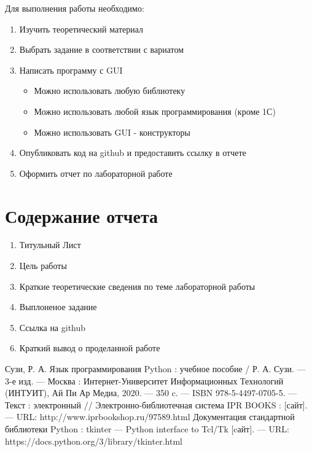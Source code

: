 \documentclass[a4paper]{article}
\begin{document}
Для выполнения работы необходимо:
\begin{enumerate}
  \item Изучить теоретический материал
  \item Выбрать задание в соответствии с вариатом
  \item Написать программу с GUI
    \begin{itemize}
      \item Можно использовать любую библиотеку
      \item Можно использовать любой язык программирования (кроме 1С)
      \item Можно использовать GUI - конструкторы
    \end{itemize}
  \item Опубликовать код на github и предоставить ссылку в отчете
  \item Оформить отчет по лабораторной работе
\end{enumerate}

\section{Содержание отчета}
\begin{enumerate}
  \item Титульный Лист
  \item Цель работы
  \item Краткие теоретические сведения по теме лабораторной работы
  \item Выплоненое задание
  \item Ссылка на github
  \item Краткий вывод о проделанной работе
\end{enumerate}

\begin{thebibliography}{3}
  Сузи, Р. А. Язык программирования Python : учебное пособие / Р. А. Сузи. — 3-е изд. — Москва : Интернет-Университет Информационных Технологий (ИНТУИТ), Ай Пи Ар Медиа, 2020. — 350 c. — ISBN 978-5-4497-0705-5. — Текст : электронный // Электронно-библиотечная система IPR BOOKS : [сайт]. — URL: http://www.iprbookshop.ru/97589.html
   Документация стандартной библиотеки Python : tkinter — Python interface to Tcl/Tk [cайт]. --- URL: https://docs.python.org/3/library/tkinter.html
\end{thebibliography}
\end{document}
